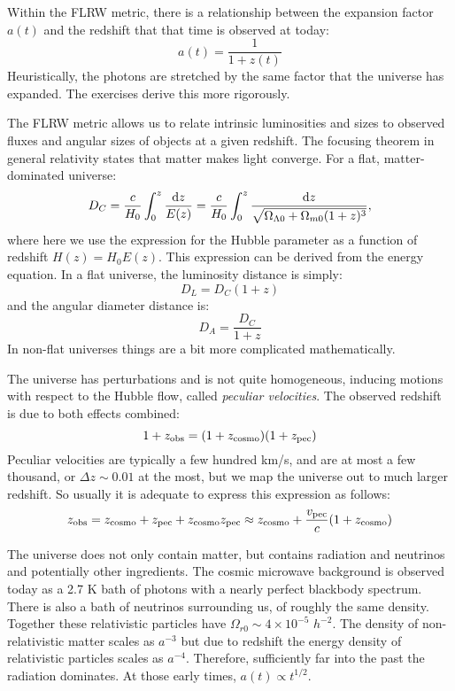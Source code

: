 Within the FLRW metric, there is a relationship between the expansion
factor $a(t)$ and the redshift that that time is observed at today:
\begin{equation}
a(t) = \frac{1}{1+z(t)}
\end{equation}
Heuristically, the photons are stretched by the same factor that the
universe has expanded. The exercises derive this more rigorously. 

The FLRW metric allows us to relate intrinsic luminosities and sizes
to observed fluxes and angular sizes of objects at a given
redshift. The focusing theorem in general relativity states that
matter makes light converge. For a flat, matter-dominated universe:
\begin{equation}
D_C= 
\frac{c}{H_0} \int_0^z \frac{{\rm d}z}{E(z)}
= 
\frac{c}{H_0} \int_0^z \frac{{\rm d}z}{\sqrt{\Omega_{\Lambda0} +
    \Omega_{m0}(1+z)^3}},
\end{equation}
where here we use the expression for the Hubble parameter as a
function of redshift $H(z) = H_0 E(z)$.  This expression can be
derived from the energy equation. In a flat universe, the luminosity
distance is simply:
\begin{equation}
D_L = D_C (1+z)
\end{equation}
and the angular diameter distance is:
\begin{equation}
D_A = \frac{D_C}{1+z}
\end{equation}
In non-flat universes things are a bit more complicated
mathematically.

The universe has perturbations and is not quite homogeneous, inducing
motions with respect to the Hubble flow, called {\it peculiar
velocities}.  The observed redshift is due to both effects combined:
\begin{equation}
1+z_{\rm obs} = (1+z_{\rm cosmo})(1+z_{\rm pec})
\end{equation}
Peculiar velocities are typically a few hundred km/s, and are at most
a few thousand, or $\Delta z \sim 0.01$ at the most, but we map the
universe out to much larger redshift. So usually it is adequate to
express this expression as follows:
\begin{equation}
z_{\rm obs} = z_{\rm cosmo}+z_{\rm pec} + z_{\rm cosmo}z_{\rm pec}
\approx z_{\rm cosmo} + \frac{v_{\rm pec}}{c} (1+z_{\rm cosmo})
\end{equation}

The universe does not only contain matter, but contains radiation and
neutrinos and potentially other ingredients.  The cosmic microwave
background is observed today as a 2.7 K bath of photons with a nearly
perfect blackbody spectrum.  There is also a bath of neutrinos
surrounding us, of roughly the same density. Together these
relativistic particles have $\Omega_{r0} \sim 4\times 10^{-5}$
$h^{-2}$.  The density of non-relativistic matter scales as $a^{-3}$
but due to redshift the energy density of relativistic particles
scales as $a^{-4}$.  Therefore, sufficiently far into the past the
radiation dominates. At those early times, $a(t)\propto t^{1/2}$.

